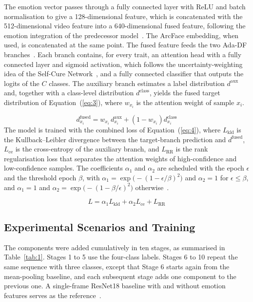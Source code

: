 \documentclass[10pt,a4paper,twocolumn]{article}
\begin{document}
The emotion vector passes through a fully connected layer with ReLU and batch normalisation to give a 128-dimensional feature, which is concatenated with the 512-dimensional video feature into a 640-dimensional fused feature, following the emotion integration of the predecessor model~\cite{wardana}. The ArcFace embedding, when used, is concatenated at the same point. The fused feature feeds the two Ada-DF branches~\cite{liu_adadf}. Each branch contains, for every trait, an attention head with a fully connected layer and sigmoid activation, which follows the uncertainty-weighting idea of the Self-Cure Network~\cite{scn}, and a fully connected classifier that outputs the logits of the $C$ classes. The auxiliary branch estimates a label distribution $d^{\text{aux}}$ and, together with a class-level distribution $d^{\text{class}}$, yields the fused target distribution of Equation~(\ref{eq:3}), where $w_{x_i}$ is the attention weight of sample $x_i$.

\begin{equation}
  d^{\text{fused}}_{x_i} = w_{x_i}\, d^{\text{aux}}_{x_i} + \left(1 - w_{x_i}\right) d^{\text{class}}_{x_i}
  \label{eq:3}
\end{equation}
The model is trained with the combined loss of Equation~(\ref{eq:4}), where $L_{\text{kld}}$ is the Kullback--Leibler divergence between the target-branch prediction and $d^{\text{fused}}$, $L_{\text{ce}}$ is the cross-entropy of the auxiliary branch, and $L_{\text{RR}}$ is the rank regularisation loss that separates the attention weights of high-confidence and low-confidence samples. The coefficients $\alpha_1$ and $\alpha_2$ are scheduled with the epoch $\epsilon$ and the threshold epoch $\beta$, with $\alpha_1 = \exp\!\big(-(1-\epsilon/\beta)^2\big)$ and $\alpha_2 = 1$ for $\epsilon \le \beta$, and $\alpha_1 = 1$ and $\alpha_2 = \exp\!\big(-(1-\beta/\epsilon)^2\big)$ otherwise~\cite{liu_adadf}.

\begin{equation}
  L = \alpha_1 L_{\text{kld}} + \alpha_2 L_{\text{ce}} + L_{\text{RR}}
  \label{eq:4}
\end{equation}
\subsection{Experimental Scenarios and Training}
The components were added cumulatively in ten stages, as summarised in Table~\ref{tab:1}. Stages 1 to 5 use the four-class labels. Stages 6 to 10 repeat the same sequence with three classes, except that Stage 6 starts again from the mean-pooling baseline, and each subsequent stage adds one component to the previous one. A single-frame ResNet18 baseline with and without emotion features serves as the reference~\cite{liu_adadf,wardana}.
\end{document}

